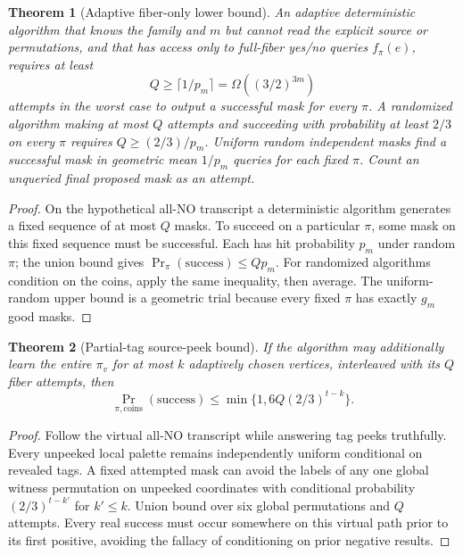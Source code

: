 \documentclass[11pt]{article}
\newtheorem{theorem}{Theorem}
\begin{document}
\begin{theorem}[Adaptive fiber-only lower bound]
An adaptive deterministic algorithm that knows the family and $m$ but \emph{cannot read the explicit source or permutations}, and that has access only to full-fiber yes/no queries $f_\pi(e)$, requires at least
\[
Q\ge\lceil1/p_m\rceil=\Omega((3/2)^{3m})
\]
attempts in the worst case to output a successful mask for every $\pi$. A randomized algorithm making at most $Q$ attempts and succeeding with probability at least $2/3$ on every $\pi$ requires $Q\ge(2/3)/p_m$. Uniform random independent masks find a successful mask in geometric mean $1/p_m$ queries for each fixed $\pi$. Count an unqueried final proposed mask as an attempt.
\end{theorem}
\begin{proof}
On the hypothetical all-NO transcript a deterministic algorithm generates a fixed sequence of at most $Q$ masks. To succeed on a particular $\pi$, some mask on this fixed sequence must be successful. Each has hit probability $p_m$ under random $\pi$; the union bound gives $\Pr_\pi(\mathrm{success})\le Qp_m$. For randomized algorithms condition on the coins, apply the same inequality, then average. The uniform-random upper bound is a geometric trial because every fixed $\pi$ has exactly $g_m$ good masks.
\end{proof}

\begin{theorem}[Partial-tag source-peek bound]
If the algorithm may additionally learn the entire $\pi_v$ for at most $k$ adaptively chosen vertices, interleaved with its $Q$ fiber attempts, then
\[
\Pr_{\pi,\mathrm{coins}}(\mathrm{success})
\le\min\{1,6Q(2/3)^{t-k}\}.
\]
\end{theorem}
\begin{proof}
Follow the virtual all-NO transcript while answering tag peeks truthfully. Every unpeeked local palette remains independently uniform conditional on revealed tags. A fixed attempted mask can avoid the labels of any one global witness permutation on unpeeked coordinates with conditional probability $(2/3)^{t-k'}$ for $k'\le k$. Union bound over six global permutations and $Q$ attempts. Every real success must occur somewhere on this virtual path prior to its first positive, avoiding the fallacy of conditioning on prior negative results.
\end{proof}
\end{document}

